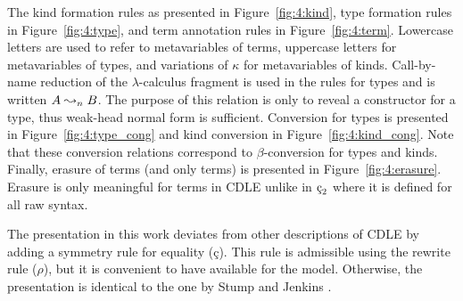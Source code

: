 The kind formation rules as presented in Figure~\ref{fig:4:kind}, type formation rules in Figure~\ref{fig:4:type}, and term annotation rules in Figure~\ref{fig:4:term}.
Lowercase letters are used to refer to metavariables of terms, uppercase letters for metavariables of types, and variations of $\kappa$ for metavariables of kinds.
Call-by-name reduction of the $\lambda$-calculus fragment is used in the rules for types and is written $A \leadsto_n B$.
The purpose of this relation is only to reveal a constructor for a type, thus weak-head normal form is sufficient.
Conversion for types is presented in Figure~\ref{fig:4:type_cong} and kind conversion in Figure~\ref{fig:4:kind_cong}.
Note that these conversion relations correspond to $\beta$-conversion for types and kinds.
Finally, erasure of terms (and only terms) is presented in Figure~\ref{fig:4:erasure}.
Erasure is only meaningful for terms in CDLE unlike in $\ced$ where it is defined for all raw syntax.

The presentation in this work deviates from other descriptions of CDLE by adding a symmetry rule for equality (\c{c}).
This rule is admissible using the rewrite rule ($\rho$), but it is convenient to have available for the model.
Otherwise, the presentation is identical to the one by Stump and Jenkins \cite{stump2021_cedillecore}.




